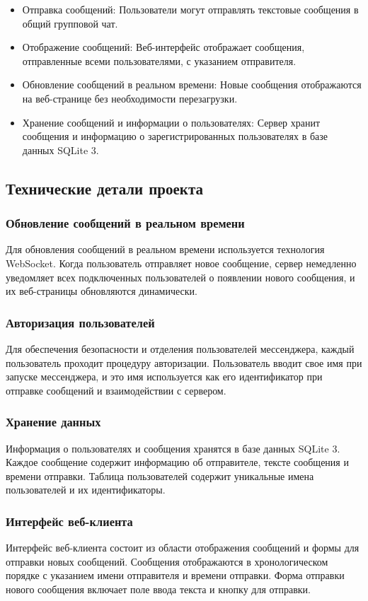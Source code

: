 \begin{itemize}
	\item Отправка сообщений: Пользователи могут отправлять текстовые сообщения в общий групповой чат.
	\item Отображение сообщений: Веб-интерфейс отображает сообщения, отправленные всеми пользователями, с указанием отправителя.
	\item Обновление сообщений в реальном времени: Новые сообщения отображаются на веб-странице без необходимости перезагрузки.
	\item Хранение сообщений и информации о пользователях: Сервер хранит сообщения и информацию о зарегистрированных пользователях в базе данных SQLite 3.

\end{itemize}

\subsection{Технические детали проекта}
\subsubsection{Обновление сообщений в реальном времени}
Для обновления сообщений в реальном времени используется технология WebSocket. Когда пользователь отправляет новое сообщение, сервер немедленно уведомляет всех подключенных пользователей о появлении нового сообщения, и их веб-страницы обновляются динамически.

\subsubsection{Авторизация пользователей}
Для обеспечения безопасности и отделения пользователей мессенджера, каждый пользователь проходит процедуру авторизации. Пользователь вводит свое имя при запуске мессенджера, и это имя используется как его идентификатор при отправке сообщений и взаимодействии с сервером.

\subsubsection{Хранение данных}
Информация о пользователях и сообщения хранятся в базе данных SQLite 3. Каждое сообщение содержит информацию об отправителе, тексте сообщения и времени отправки. Таблица пользователей содержит уникальные имена пользователей и их идентификаторы.

\subsubsection{Интерфейс веб-клиента}
Интерфейс веб-клиента состоит из области отображения сообщений и формы для отправки новых сообщений. Сообщения отображаются в хронологическом порядке с указанием имени отправителя и времени отправки. Форма отправки нового сообщения включает поле ввода текста и кнопку для отправки.



